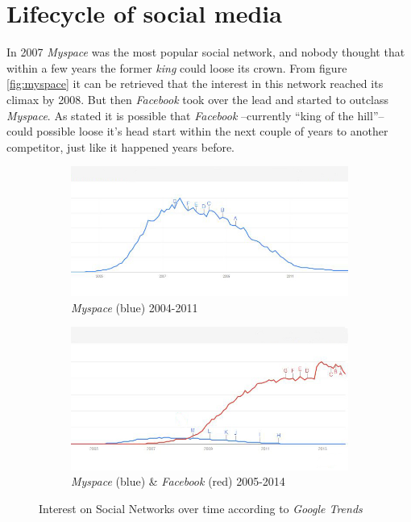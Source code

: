 \documentclass[11pt,a4paper]{report}
\begin{document}
\section{Lifecycle of social media}
In 2007 \emph{Myspace} was the most popular social network, and nobody thought that within a few years the former \emph{king} could loose its crown. From figure \vref{fig:myspace} it can be retrieved that the interest in this network reached its climax by 2008. But then \emph{Facebook} took over the lead and started to outclass \emph{Myspace}. As \textcite{Dube:2013aa} stated it is possible that \emph{Facebook} --currently \enquote{king of the hill}-- could possible loose it's head start within the next couple of years to another competitor, just like it happened years before.
\begin{figure}[h]
\centering
\begin{subfigure}{.5\textwidth}
  \centering
  \includegraphics[width=0.98\linewidth]{./Pictures/facebook-myspace1.jpg}
  \caption{\emph{Myspace} (blue) 2004-2011}
  \label{fig:myspace}
\end{subfigure}%
\begin{subfigure}{.5\textwidth}
  \centering
  \includegraphics[width=0.98\linewidth]{./Pictures/facebook-myspace2.jpg}
  \caption{\emph{Myspace} (blue) \& \emph{Facebook} (red) 2005-2014}
  \label{fig:myspace+fb}
\end{subfigure}
\caption[Interest on Social Networks over time 
 \emph{Google Trends} retrieved from \cite{Dube:2013aa}]{Interest on Social Networks over time according to \emph{Google Trends}}
\label{fig:google_trends}
\end{figure}
\end{document}
